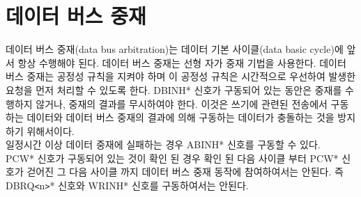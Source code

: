 \section{데이터 버스 중재}
데이터 버스 중재(data bus arbitration)는
데이터 기본 사이클(data basic cycle)에 앞서 항상 수행해야 된다.
데이터 버스 중재는 선형 자가 중재 기법을 사용한다.
데이터 버스 중재는 공정성 규칙을 지켜야 하며 이 공정성 규칙은 시간적으로
우선하여 발생한 요청을 먼저 처리할 수 있도록 한다.
DBINH* 신호가 구동되어 있는 동안은 중재를 수행하지 않거나,
중재의 결과를 무시하여야 한다.
이것은 쓰기에 관련된 전송에서 구동하는 데이터와 데이터 버스 중재의 결과에 의해
구동하는 데이터가 충돌하는 것을 방지하기 위해서이다. \\
일정시간 이상 데이터 중재에 실패하는 경우 ABINH* 신호를 구동할 수 있다. \\
PCW* 신호가 구동되어 있는 것이 확인 된 경우 확인 된 다음 사이클 부터
PCW* 신호가 걷어진 그 다음 사이클 까지 데이터 버스 중재 동작에
참여하여서는 안된다. 즉 DBRQ{\tt <}n{\tt >}* 신호와
WRINH* 신호를 구동하여서는 안된다.
%
